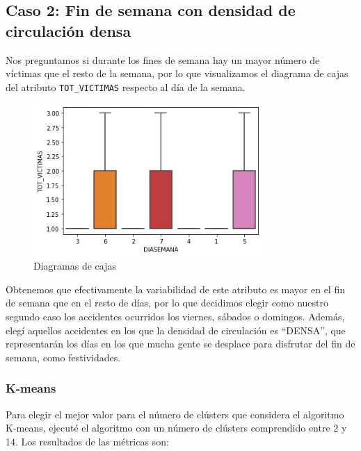 \documentclass[a4]{article}
\begin{document}
\newpage
\subsection{Caso 2: Fin de semana con densidad de circulación densa}

Nos preguntamos si durante los fines de semana hay un mayor número de víctimas que el resto de la semana, por lo que visualizamos el diagrama de cajas del atributo \texttt{TOT\_VICTIMAS} respecto al día de la semana.

\begin{figure}[H]
  \centering
  \caption{Diagramas de cajas}
  \includegraphics[width=87mm]{imagenes/c2_selec_atr}
\end{figure}

Obtenemos que efectivamente la variabilidad de este atributo es mayor en el fin de semana que en el resto de días, por lo que decidimos elegir como nuestro segundo caso los accidentes ocurridos los viernes, sábados o domingos.  Además, elegí aquellos accidentes en los que la densidad de circulación es ``DENSA'', que representarán los días en los que mucha gente se desplace para disfrutar del fin de semana, como festividades.

\subsubsection{K-means}

Para elegir el mejor valor para el número de clústers que considera el algoritmo K-means, ejecuté el algoritmo con un número de clústers comprendido entre 2 y 14. Los resultados de las métricas son:
\end{document}
